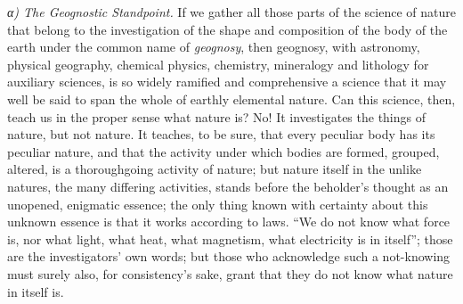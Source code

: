 \documentclass[12pt,a4paper]{book}
\newcommand{\subrunin}[1]{\emph{#1}\hspace{0.4em}}
\begin{document}
\subrunin{α) The Geognostic Standpoint.} If we gather all those parts of the science of nature that belong to the
investigation of the shape and composition of the body of the earth under the common name of \emph{geognosy}, then
geognosy, with astronomy, physical geography, chemical physics, chemistry, mineralogy and lithology for auxiliary
sciences, is so widely ramified and comprehensive a science that it may well be said to span the whole of earthly
elemental nature. Can this science, then, teach us in the proper sense what nature is? No! It investigates the things of
nature, but not nature. It teaches, to be sure, that every peculiar body has its peculiar nature, and that the activity
under which bodies are formed, grouped, altered, is a thoroughgoing activity of nature; but nature itself in the unlike
natures, the many differing activities, stands before the beholder's thought as an unopened, enigmatic essence; the only
thing known with certainty about this unknown essence is that it works according to laws. ``We do not know what force is,
nor what light, what heat, what magnetism, what electricity is in itself''; those are the investigators' own words; but
those who acknowledge such a not-knowing must surely also, for consistency's sake, grant that they do not know what
nature in itself is.
\end{document}
